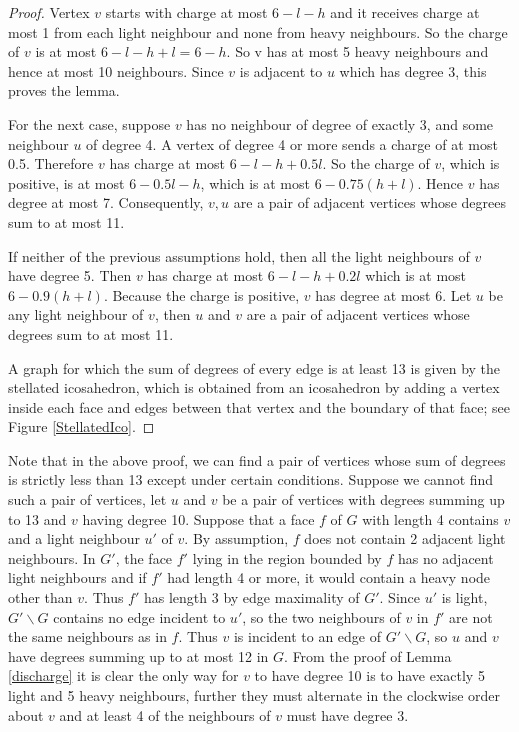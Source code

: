 \documentclass{article}
\newcommand{\0}{\mathbb{0}}
\newcommand{\1}{\mathbb{1}}
\begin{document}
\begin{proof}
 Vertex $v$ starts with charge at most $6-l-h$ and it receives charge at most 1 from each light neighbour and none from heavy neighbours. So the charge of $v$ is at most  $6-l-h +l =6 -h $.  So v has at most 5 heavy neighbours and hence at most 10 neighbours. Since $v$ is adjacent to $u$ which has degree 3, this proves the lemma. 
 
 For the next case, suppose $v$ has no neighbour of degree of exactly 3, and some neighbour $u$ of degree 4.  A vertex of degree 4 or more sends a charge of at most 0.5. Therefore $v$ has charge at most $ 6-l-h +0.5l $.   So the charge of $v$, which is positive, is at most $ 6-0.5l-h $, which is at most  $6- 0.75(h+l) $. Hence $v$ has degree at most 7. Consequently, $v,u$ are a pair of adjacent vertices whose degrees sum to at most 11. 
 
 If neither of the previous assumptions hold, then all the light neighbours of $v$ have degree 5. Then $v$ has charge at most $ 6-l-h +0.2l $ which is at most $6-0.9(h+l) $. Because the charge is positive, $v$ has degree at most 6. Let $u$ be any light neighbour of $v$, then $u$ and $v$ are a pair of adjacent vertices whose degrees sum to at most 11.
 
 A graph for which the sum of degrees of every edge is at least 13 is given by the stellated icosahedron, which is obtained from an icosahedron  by adding a vertex  inside each face and edges between that vertex and the boundary of that face; see Figure \ref{StellatedIco}.
 \end{proof}
Note that in the above proof, we can find a pair of vertices whose sum of degrees is strictly less than 13 except under certain conditions.  Suppose we cannot find such a pair of vertices, let $u$ and $v$ be a pair of vertices with degrees summing up to 13 and $v$ having degree 10.  Suppose that a face $f$ of $G$ with length 4 contains $v$ and a light neighbour $u'$ of $v$.  By assumption, $f$ does not contain 2 adjacent light neighbours. In $G'$, the face $f'$ lying in the region bounded by $f$ has no adjacent light neighbours and if $f'$ had length 4 or more, it would contain a heavy node other than $v$. Thus $f'$ has length 3 by edge maximality of $G'$. Since $u'$ is light, $G' \backslash G $ contains no edge incident to $u'$, so the two neighbours of $v$ in $f'$ are not the same neighbours as in $f$. Thus  $v$ is incident to an edge of $G' \backslash G$, so $u$ and $v$ have degrees summing up to at most 12 in $G$. 
From the proof of Lemma \ref{discharge} it is clear the only way for $v$ to have degree 10 is to have exactly 5 light and 5 heavy neighbours, further they must alternate in the clockwise order about $v$ and at least 4 of the neighbours of $v$ must have degree 3.
\end{document}
